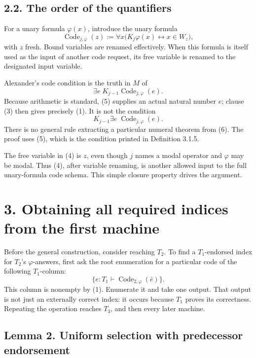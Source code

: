 \documentclass[
  11pt,
  letterpaper,
]{article}
\begin{document}
\subsection{2.2. The order of the
quantifiers}\label{the-order-of-the-quantifiers}

For a unary formula \(\varphi(x)\), introduce the unary formula \[
\operatorname{Code}_{j,\varphi}(z)
:=\forall x\bigl(K_j\varphi(x)\leftrightarrow x\in W_z\bigr),
\tag{4}
\] with \(z\) fresh. Bound variables are renamed effectively. When this
formula is itself used as the input of another code request, its free
variable is renamed to the designated input variable.

Alexander's code condition is the truth in \(M\) of \[
\exists e\;K_{j-1}\operatorname{Code}_{j,\varphi}(e).
\tag{5}
\] Because arithmetic is standard, (5) supplies an actual natural number
\(e\); clause (3) then gives precisely (1). It is not the condition \[
K_{j-1}\exists e\;\operatorname{Code}_{j,\varphi}(e).
\tag{6}
\] There is no general rule extracting a particular numeral theorem from
(6). The proof uses (5), which is the condition printed in Definition
3.1.5.

The free variable in (4) is \(z\), even though \(j\) names a modal
operator and \(\varphi\) may be modal. Thus (4), after variable
renaming, is another allowed input to the full unary-formula code
schema. This simple closure property drives the argument.

\section{3. Obtaining all required indices from the first
machine}\label{obtaining-all-required-indices-from-the-first-machine}

Before the general construction, consider reaching \(T_2\). To find a
\(T_1\)-endorsed index for \(T_2\)'s \(\varphi\)-answers, first ask the
root enumeration for a particular code of the following \(T_1\)-column:
\[
\{e:T_1\vdash\operatorname{Code}_{2,\varphi}(\bar e)\}.
\tag{7}
\] This column is nonempty by (1). Enumerate it and take one output.
That output is not just an externally correct index: it occurs because
\(T_1\) proves its correctness. Repeating the operation reaches \(T_3\),
and then every later machine.

\subsection{Lemma 2. Uniform selection with predecessor
endorsement}\label{lemma-2.-uniform-selection-with-predecessor-endorsement}
\end{document}
